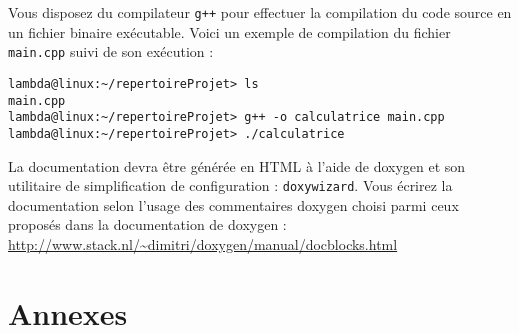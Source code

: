 \documentclass[12pt,a4paper,oneside,titlepage,final]{article}
\begin{document}
 Vous disposez du compilateur \lstinline{g++} pour effectuer la
 compilation du code source en un fichier binaire exécutable. Voici un
 exemple de compilation du fichier \lstinline{main.cpp} suivi de son
 exécution :

\begin{lstlisting}[style=groolotScript]
lambda@linux:~/repertoireProjet> ls
main.cpp
lambda@linux:~/repertoireProjet> g++ -o calculatrice main.cpp
lambda@linux:~/repertoireProjet> ./calculatrice
\end{lstlisting}


La documentation devra être générée en HTML à l'aide de \gls{doxygen}
et son utilitaire de simplification de configuration :
\lstinline{doxywizard}\cite{doxywizard}. Vous écrirez la documentation
selon l'usage des commentaires \gls{doxygen} choisi parmi ceux
proposés dans la documentation de \gls{doxygen} :
\url{http://www.stack.nl/~dimitri/doxygen/manual/docblocks.html}



\newpage
\appendix
\section{Annexes}
\end{document}
